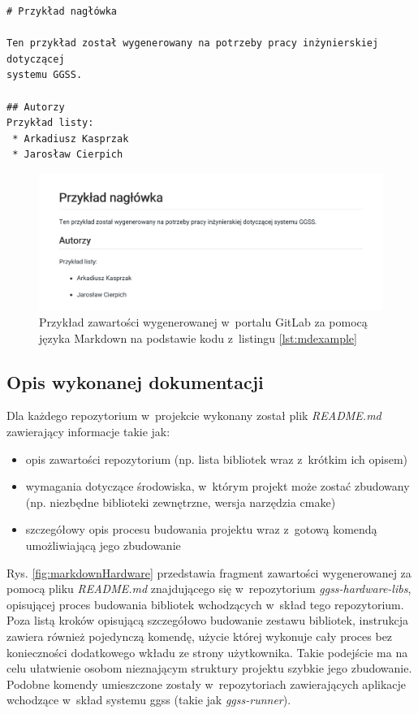 \begin{lstlisting}[caption={Przykład prostego pliku napisanego w~języku Markdown}, label={lst:mdexample}]
# Przykład nagłówka

Ten przykład został wygenerowany na potrzeby pracy inżynierskiej dotyczącej 
systemu GGSS.

## Autorzy
Przykład listy:
 * Arkadiusz Kasprzak
 * Jarosław Cierpich
\end{lstlisting}

\begin{figure}
\centering
\includegraphics[width=\textwidth]{res/MarkdownExample}
\caption{Przykład zawartości wygenerowanej w~portalu GitLab za pomocą języka Markdown na podstawie kodu z~listingu \ref{lst:mdexample}}
\label{fig:markdownExample}
\end{figure}

\newpage

\subsection{Opis wykonanej dokumentacji}
Dla każdego repozytorium w~projekcie wykonany został plik \textit{README.md} zawierający informacje takie jak:
\begin{itemize}
\item opis zawartości repozytorium (np. lista bibliotek wraz z~krótkim ich opisem)
\item wymagania dotyczące środowiska, w~którym projekt może zostać zbudowany (np. niezbędne biblioteki zewnętrzne, wersja narzędzia \gls*{cmake})
\item szczegółowy opis procesu budowania projektu wraz z~gotową komendą umożliwiającą jego zbudowanie 
\end{itemize}

Rys. \ref{fig:markdownHardware} przedstawia fragment zawartości wygenerowanej za pomocą pliku \textit{README.md} znajdującego się w~repozytorium \textit{ggss-hardware-libs}, opisującej proces budowania bibliotek wchodzących w~skład tego repozytorium. Poza listą kroków opisującą szczegółowo budowanie zestawu bibliotek, instrukcja zawiera również pojedynczą komendę, użycie której wykonuje cały proces bez konieczności dodatkowego wkładu ze strony użytkownika. Takie podejście ma na celu ułatwienie osobom nieznającym struktury projektu szybkie jego zbudowanie. Podobne komendy umieszczone zostały w~repozytoriach zawierających aplikacje wchodzące w~skład systemu \gls*{ggss} (takie jak \textit{ggss-runner}).

